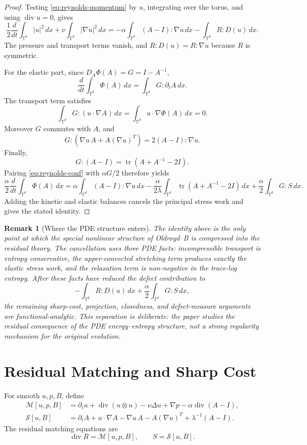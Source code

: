 \documentclass[11pt]{article}
\numberwithin{equation}{section}
\newtheorem{remark}[theorem]{Remark}
\newcommand{\T}{\mathbb T}
\newcommand{\Id}{I}
\newcommand{\tr}{\operatorname{tr}}
\newcommand{\divv}{\operatorname{div}}
\newcommand{\calM}{\mathcal M}
\begin{document}
\begin{proof}
Testing \eqref{eq:reynolds-momentum} by \(u\), integrating over the torus, and
using \(\divv u=0\), gives
\[
  \frac12\frac{d}{dt}\int_{\T^d}|u|^2\,dx
  +\nu\int_{\T^d}|\nabla u|^2\,dx
  =
  -\alpha\int_{\T^d}(A-\Id):\nabla u\,dx
  -\int_{\T^d}R:D(u)\,dx .
\]
The pressure and transport terms vanish, and \(R:D(u)=R:\nabla u\) because
\(R\) is symmetric.

For the elastic part, since \(D_A\Phi(A)=G=\Id-A^{-1}\),
\[
  \frac{d}{dt}\int_{\T^d}\Phi(A)\,dx
  =
  \int_{\T^d}G:\partial_t A\,dx .
\]
The transport term satisfies
\[
  \int_{\T^d}G:(u\cdot\nabla A)\,dx
  =
  \int_{\T^d}u\cdot\nabla\Phi(A)\,dx=0.
\]
Moreover \(G\) commutes with \(A\), and
\[
  G:(\nabla u\,A+A(\nabla u)^T)
  =
  2(A-\Id):\nabla u .
\]
Finally,
\[
  G:(A-\Id)=\tr(A+A^{-1}-2\Id).
\]
Pairing \eqref{eq:reynolds-conf} with \(\alpha G/2\) therefore yields
\[
  \frac{\alpha}{2}\frac{d}{dt}\int_{\T^d}\Phi(A)\,dx
  =
  \alpha\int_{\T^d}(A-\Id):\nabla u\,dx
  -\frac{\alpha}{2\lambda}
  \int_{\T^d}\tr(A+A^{-1}-2\Id)\,dx
  +\frac{\alpha}{2}\int_{\T^d}G:S\,dx .
\]
Adding the kinetic and elastic balances cancels the principal stress work and
gives the stated identity.
\end{proof}

\begin{remark}[Where the PDE structure enters]
\label{rem:pde-structure-input}
The identity above is the only point at which the special nonlinear structure
of Oldroyd--B is compressed into the residual theory.  The cancellation uses
three PDE facts: incompressible transport is entropy conservative, the
upper-convected stretching term produces exactly the elastic stress work, and
the relaxation term is non-negative in the trace-log entropy.  After these
facts have reduced the defect contribution to
\[
  -\int_{\T^d}R:D(u)\,dx+\frac{\alpha}{2}\int_{\T^d}G:S\,dx ,
\]
the remaining sharp-cost, projection, closedness, and defect-measure arguments
are functional-analytic.  This separation is deliberate: the paper studies the
residual consequence of the PDE energy--entropy structure, not a strong
regularity mechanism for the original evolution.
\end{remark}

\section{Residual Matching and Sharp Cost}
\label{sec:matching}

For smooth \(u,p,B\), define
\begin{align}
  \calM[u,p,B]
  &=
  \partial_t u+\divv(u\otimes u)-\nu\Delta u+\nabla p
  -\alpha\divv(A-\Id),\\
  \mathcal S[u,B]
  &=
  \partial_t A+u\cdot\nabla A-\nabla u\,A-A(\nabla u)^T
  +\lambda^{-1}(A-\Id).
\end{align}
The residual matching equations are
\[
  \divv R=\calM[u,p,B],\qquad S=\mathcal S[u,B].
\]
\end{document}
